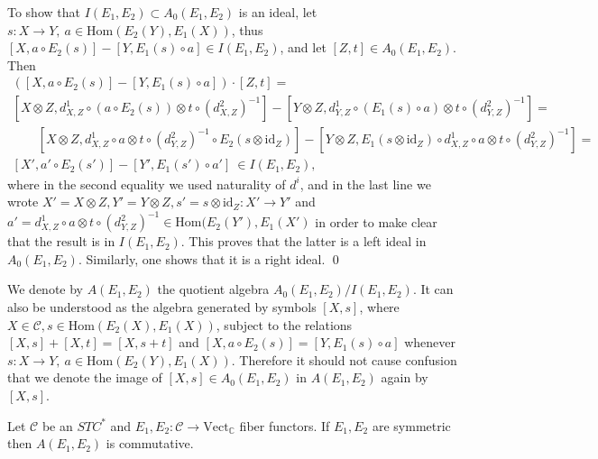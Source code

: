\documentclass[12pt]{article}
\theoremstyle{definition}
\theoremstyle{definition}
\theoremstyle{remark}
\newcommand{\Vect}{\mathrm{Vect}}
\def\2#1{{\mathcal #1}}
\def\7#1{{\mathbb #1}}
\newcommand{\Hom}{\mathrm{Hom}}
\newcommand{\rarr}{\rightarrow}
\def\id{\mathrm{id}}
\begin{document}
\prf  To show that $I(E_1,E_2)\subset A_0(E_1,E_2)$ is an ideal, let 
$s:X\rarr Y,\ a\in\Hom(E_2(Y),E_1(X))$, thus $[X,a\circ E_2(s)]-[Y,E_1(s)\circ a]\in I(E_1,E_2)$,
and let $[Z,t]\in A_0(E_1,E_2)$. Then 
\begin{multline*} ([X, a\circ E_2(s)]-[Y,E_1(s)\circ a ]) \cdot [Z,t]  = \\
   [X\otimes Z, d^1_{X,Z}\circ (a\circ E_2(s))\otimes t\circ (d^2_{X,Z})^{-1}] -
	 [Y\otimes Z, d^1_{Y,Z}\circ (E_1(s)\circ a)\otimes t\circ (d^2_{Y,Z})^{-1}] = \\
    \qquad [X\otimes Z, d^1_{X,Z}\circ a \otimes t\circ (d^2_{Y,Z})^{-1}\circ E_2(s\otimes\id_Z)] -
   [Y\otimes Z, E_1(s\otimes\id_Z)\circ d^1_{X,Z}\circ a\otimes t\circ (d^2_{Y,Z})^{-1}] = \\
   [X', a'\circ E_2(s')] - [Y', E_1(s')\circ a'] \ \in I(E_1,E_2), 
\end{multline*}
where in the second equality we used naturality of $d^i$, and in the last line we wrote 
$X'=X\otimes Z, Y'=Y\otimes Z, s'=s\otimes\id_Z: X'\rarr Y'$ and
$a'=d^1_{X,Z}\circ a \otimes t\circ (d^2_{Y,Z})^{-1}\in\Hom(E_2(Y'),E_1(X')$ in order 
to make clear that the result is in $I(E_1,E_2)$. This proves that the latter is a  left ideal in
$A_0(E_1,E_2)$. Similarly, one shows that it is a right ideal. 
\qed

We denote by $A(E_1,E_2)$ the quotient algebra $A_0(E_1,E_2)/I(E_1,E_2)$. It can also be understood
as the algebra generated by symbols $[X,s]$, where $X\in\2C, s\in\Hom(E_2(X),E_1(X))$, subject to
the relations $[X,s]+[X,t]=[X,s+t]$ and $[X, a\circ E_2(s)]=[Y,E_1(s)\circ a ]$ whenever 
$s:X\rarr Y,\ a\in\Hom(E_2(Y),E_1(X))$. Therefore it should not cause confusion that we denote the image 
of $[X,s]\in A_0(E_1,E_2)$ in $A(E_1,E_2)$ again by $[X,s]$.



\bprop \label{prop-comm}
Let $\2C$ be an $STC^*$ and $E_1,E_2: \2C\rarr\Vect_\7C$ fiber functors. If $E_1,E_2$ are symmetric
then $A(E_1,E_2)$ is commutative.   
\eprop
\end{document}
